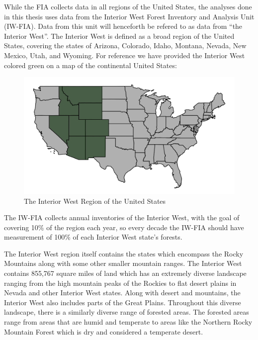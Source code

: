 \documentclass[12pt,twoside]{reedthesis}
\begin{document}
While the FIA collects data in all regions of the United States, the analyses done in this thesis uses data from the Interior West Forest Inventory and Analysis Unit (IW-FIA). Data from this unit will henceforth be refered to as data from ``the Interior West''. The Interior West is defined as a broad region of the United States, covering the states of Arizona, Colorado, Idaho, Montana, Nevada, New Mexico, Utah, and Wyoming. For reference we have provided the Interior West colored green on a map of the continental United States:
\begin{figure}

{\centering \includegraphics[width=1\linewidth]{figure/interior-west-on-usa} 

}

\caption{The Interior West Region of the United States}\label{fig:unnamed-chunk-3}
\end{figure}
The IW-FIA collects annual inventories of the Interior West, with the goal of covering 10\% of the region each year, so every decade the IW-FIA should have measurement of 100\% of each Interior West state's forests.

The Interior West region itself contains the states which encompass the Rocky Mountains along with some other smaller mountain ranges. The Interior West contains 855,767 square miles of land which has an extremely diverse landscape ranging from the high mountain peaks of the Rockies to flat desert plains in Nevada and other Interior West states. Along with desert and mountains, the Interior West also includes parts of the Great Plains. Throughout this diverse landscape, there is a similarly diverse range of forested areas. The forested areas range from areas that are humid and temperate to areas like the Northern Rocky Mountain Forest which is dry and considered a temperate desert.
\end{document}

